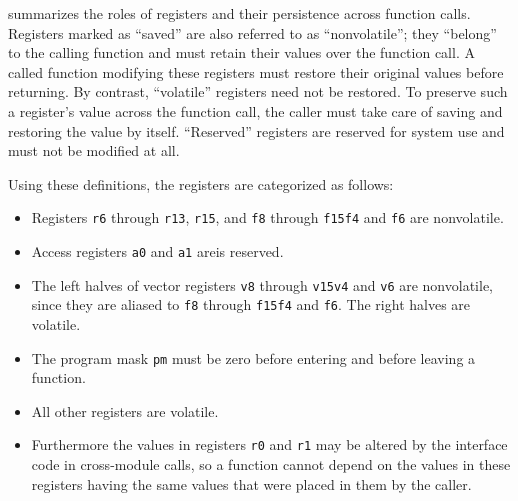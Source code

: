 \documentclass[english,11pt,twoside,toc=bib,toc=idx]{scrreprt}
\begin{document}
 summarizes the roles of registers and their
persistence across function calls.
Registers marked as ``saved'' are also referred to as
``nonvolatile''; they ``belong'' to the calling
function and must retain their values over the function call.  A called
function modifying these registers must restore their original values
before returning.  By contrast, ``volatile'' registers
need not be restored.  To preserve such a register's value across the
function call, the caller must take care of saving and restoring the value
by itself.  ``Reserved'' registers are reserved for system use and must
not be modified at all.

Using these definitions, the registers are categorized as follows:
\begin{itemize}
\item Registers \texttt{r6} through \texttt{r13}, \texttt{r15},
  {\ifzseries and \texttt{f8} through \texttt{f15}\else \texttt{f4}
    and \texttt{f6}\fi} are nonvolatile.
\item Access register{\ifzseries s\fi} \texttt{a0} {\ifzseries and
    \texttt{a1} are\else is\fi} reserved.
\item The left halves of vector registers {\ifzseries \texttt{v8} through
    \texttt{v15}\else \texttt{v4} and \texttt{v6}\fi} are nonvolatile,
  since they are aliased to {\ifzseries \texttt{f8} through
    \texttt{f15}\else \texttt{f4} and \texttt{f6}\fi}.  The right halves
  are volatile.
\item The program mask \texttt{pm} must be zero before entering and before
  leaving a function.
\item All other registers are volatile.
\item Furthermore the values in registers \texttt{r0} and \texttt{r1}
  may be altered by the interface code in cross-module calls, so a
  function cannot depend on the values in these registers having the
  same values that were placed in them by the caller.
\end{itemize}
\end{document}
